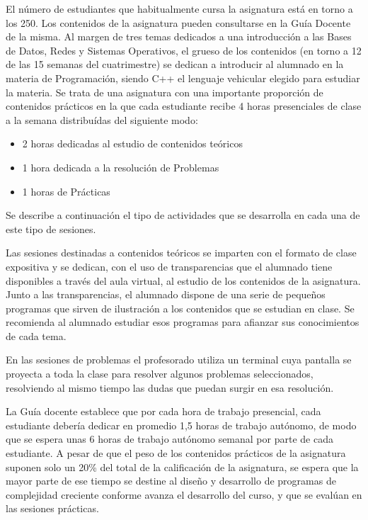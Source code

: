 \documentclass[twocolumn,twoside,a4paper, 10pt]{article}
\begin{document}
El número de estudiantes que habitualmente cursa la asignatura está en torno a los 250. 
Los contenidos de la asignatura pueden consultarse en la Guía Docente \cite{ULL:2022:GD} de la misma.
Al margen de tres temas dedicados a una introducción a las Bases de Datos, Redes y Sistemas Operativos,
el grueso de los contenidos (en torno a 12 de las 15 semanas del cuatrimestre) se dedican a introducir al
alumnado en la materia de Programación, siendo C++ el lenguaje vehicular elegido para estudiar la materia.
Se trata de una asignatura con una importante proporción de contenidos prácticos en la que cada estudiante
recibe 4 horas presenciales de clase a la semana distribuídas del siguiente modo:
\begin{itemize}
  \item 2 horas dedicadas al estudio de contenidos teóricos
  \item 1 hora dedicada a la resolución de Problemas
  \item 1 horas de Prácticas
\end{itemize}
Se describe a continuación el tipo de actividades que se desarrolla en cada una de este tipo de sesiones.

Las sesiones destinadas a contenidos teóricos se imparten con el formato de clase expositiva y se dedican, 
con el uso de transparencias que el alumnado tiene disponibles a través del aula virtual, al estudio de los 
contenidos de la asignatura. 
Junto a las transparencias, el alumnado dispone de una serie de pequeños programas que sirven de ilustración a
los contenidos que se estudian en clase. 
Se recomienda al alumnado estudiar esos programas para afianzar sus conocimientos de cada tema.

En las sesiones de problemas el profesorado utiliza un terminal cuya pantalla se proyecta a toda la clase para
resolver algunos problemas seleccionados, resolviendo al mismo tiempo las dudas que puedan surgir en esa
resolución. 

La Guía docente establece que por cada hora de trabajo presencial, cada estudiante debería dedicar en 
promedio 1,5 horas de trabajo autónomo, de modo que se espera unas 6 horas de trabajo autónomo semanal por 
parte de cada estudiante. 
A pesar de que el peso de los contenidos prácticos de la asignatura suponen solo un 20\% del total de la
calificación de la asignatura, se espera que la mayor parte de ese tiempo se destine al diseño y desarrollo 
de programas de complejidad creciente conforme avanza el desarrollo del curso, y que se evalúan en las
sesiones prácticas.
\end{document}
